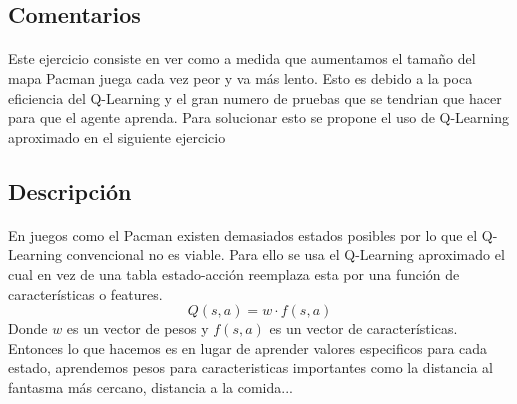 \documentclass{report}
\begin{document}
      \subsection*{Comentarios}
        \paragraph*{}{
          Este ejercicio consiste en ver como a medida que aumentamos el tamaño del mapa Pacman juega cada vez peor y va más lento.
          Esto es debido a la poca eficiencia del Q-Learning y el gran numero de pruebas que se tendrian que hacer para que el agente aprenda.
          Para solucionar esto se propone el uso de Q-Learning aproximado en el siguiente ejercicio
        }
      \subsection*{Descripción}
        \paragraph*{}
        {
          En juegos como el Pacman existen demasiados estados posibles por lo que el Q-Learning convencional no es viable.
          Para ello se usa el Q-Learning aproximado el cual en vez de una tabla estado-acción reemplaza esta por una función de características o features.
          \[ Q(s,a) = w \cdot f(s,a) \]
          Donde \(w\) es un vector de pesos y \(f(s,a)\) es un vector de características.
          Entonces lo que hacemos es en lugar de aprender valores especificos para cada estado, aprendemos pesos para caracteristicas importantes como la distancia al fantasma más cercano, distancia a la comida...
        }
\end{document}
